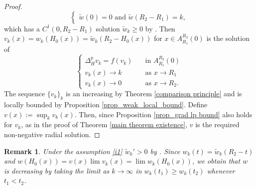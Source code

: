 \documentclass[11pt]{amsart}
\newtheorem{remark}{Remark}
\numberwithin{equation}{section}
\begin{document}
\begin{proof}
\begin{equation*}
\begin{cases}
               \tilde{w}(0)=0 \text{ and }\tilde{w}(R_{2}-R_{1})=k,
           \end{cases}
       \end{equation*}
       which has a $C^{1}(0,R_{2}-R_{1})$ solution $\tilde{w}_{k}\geq 0$ by \cite[Proposition 4.2.1]{PucciSerrinbook2007}. Then $v_{k}(x)=w_{k}(H_{0}(x))=\tilde{w}_{k}(R_{2}-H_{0}(x))$ for $x\in A_{R_{1}}^{R_{2}}(0)$ is the solution of
       \begin{equation*}
           \begin{cases}
           \Delta_{H}^{p}v_{k}=f(v_{k})\quad &\text{in }A_{R_{1}}^{R_{2}}(0)\\
           v_{k}(x)\to k &\text{as } x\to R_{1}\\
           v_{k}(x)\to 0 &\text{as } x\to R_{2}.
       \end{cases}
       \end{equation*}
       The sequence $\{v_{k}\}_{k}$ is an increasing by Theorem \ref{comparison principle} and is locally bounded by Proposition \ref{prop_weak_local_bound}. Define $v(x):=\sup_{k}v_{k}(x)$. Then, since Proposition \ref{prop_grad lp bound} also holds for $v_{k}$, as in the proof of Theorem \ref{main theorem existence}, $v$ is the required non-negative radial solution.
   \end{proof}
   \begin{remark}
     Under the assumption \ref{i1} $\tilde{w}_{k}'>0$ by \cite[Proposition 4.2.2]{PucciSerrinbook2007}.  Since $w_{k}(t)=\tilde{w}_{k}(R_{2}-t)$ and $w(H_{0}(x))=v(x)\lim v_{k}(x)=\lim w_{k}(H_{0}(x))$, we obtain that $w$ is decreasing by taking the limit as $k\to \infty$ in $w_{k}(t_{1})\geq w_{k}(t_{2})$ whenever $t_{1}<t_{2}$.
   \end{remark}
   
\end{document}
